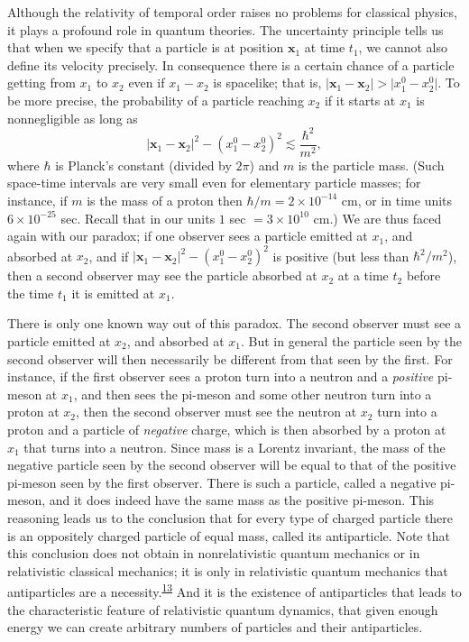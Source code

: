 Although the relativity of temporal order raises no problems for classical
physics, it plays a profound role in quantum theories. The uncertainty
principle tells us that when we specify that a particle is at position
\(\mathbf x_1\) at time \(t_1\), we cannot also define its velocity precisely.
In consequence there is a certain chance of a particle getting from \(x_1\) to
\(x_2\) even if \(x_1-x_2\) is spacelike; that is,
\(\lvert\mathbf x_1-\mathbf x_2\rvert
>\lvert x_1^0-x_2^0\rvert\). To be more precise, the probability of a
particle reaching \(x_2\) if it starts at \(x_1\) is nonnegligible as long as
\[
  \lvert\mathbf x_1-\mathbf x_2\rvert^2
  -(x_1^0-x_2^0)^2\lesssim\frac{\hbar^2}{m^2},
\]
where \(\hbar\) is Planck's constant (divided by \(2\pi\)) and \(m\) is the
particle mass. (Such space-time intervals are very small even for elementary
particle masses; for instance, if \(m\) is the mass of a proton then
\(\hbar/m=2\times10^{-14}\) cm, or in time units
\(6\times10^{-25}\) sec. Recall that in our units
\(1\) sec \(=3\times10^{10}\) cm.) We are thus faced again with our paradox;
if one observer sees a particle emitted at \(x_1\), and absorbed at \(x_2\),
and if
\(\lvert\mathbf x_1-\mathbf x_2\rvert^2-(x_1^0-x_2^0)^2\) is positive
(but less than \(\hbar^2/m^2\)), then a second observer may see the particle
absorbed at \(x_2\) at a time \(t_2\) before the time \(t_1\) it is emitted at
\(x_1\).

There is only one known way out of this paradox. The second observer must see a
particle emitted at \(x_2\), and absorbed at \(x_1\). But in general the
particle seen by the second observer will then necessarily be different from
that seen by the first. For instance, if the first observer sees a proton turn
into a neutron and a \emph{positive} pi-meson at \(x_1\), and then sees the
pi-meson and some other neutron turn into a proton at \(x_2\), then the second
observer must see the neutron at \(x_2\) turn into a proton and a particle of
\emph{negative} charge, which is then absorbed by a proton at \(x_1\) that
turns into a neutron. Since mass is a Lorentz invariant, the mass of the
negative particle seen by the second observer will be equal to that of the
positive pi-meson seen by the first observer. There is such a particle, called
a negative pi-meson, and it does indeed have the same mass as the positive
pi-meson. This reasoning leads us to the conclusion that for every type of
charged particle there is an oppositely charged particle of equal mass, called
its antiparticle. Note that this conclusion does not obtain in nonrelativistic
quantum mechanics or in relativistic classical mechanics; it is only in
relativistic quantum mechanics that antiparticles are a
necessity.\textsuperscript{\hyperref[ch2-ref-13]{13}} And it is the existence
of antiparticles that leads to the characteristic feature of relativistic
quantum dynamics, that given enough energy we can create arbitrary numbers of
particles and their antiparticles.
